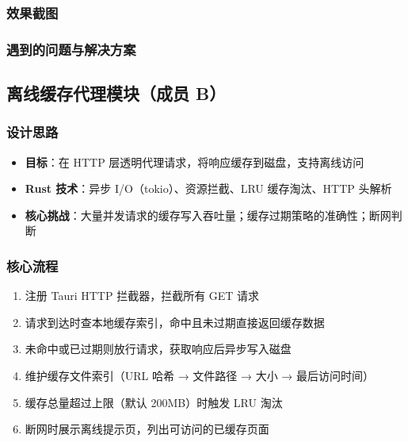 \documentclass[12pt,a4paper]{ctexart}
\begin{document}
\subsubsection{效果截图}


\subsubsection{遇到的问题与解决方案}


\subsection{离线缓存代理模块（成员 B）}

\subsubsection{设计思路}

\begin{itemize}
  \item \textbf{目标}：在 HTTP 层透明代理请求，将响应缓存到磁盘，支持离线访问
  \item \textbf{Rust 技术}：异步 I/O（tokio）、资源拦截、LRU 缓存淘汰、HTTP 头解析
  \item \textbf{核心挑战}：大量并发请求的缓存写入吞吐量；缓存过期策略的准确性；断网判断
\end{itemize}


\subsubsection{核心流程}

\begin{enumerate}[label=(\arabic*)]
  \item 注册 Tauri HTTP 拦截器，拦截所有 GET 请求
  \item 请求到达时查本地缓存索引，命中且未过期直接返回缓存数据
  \item 未命中或已过期则放行请求，获取响应后异步写入磁盘
  \item 维护缓存文件索引（URL 哈希 → 文件路径 → 大小 → 最后访问时间）
  \item 缓存总量超过上限（默认 200MB）时触发 LRU 淘汰
  \item 断网时展示离线提示页，列出可访问的已缓存页面
\end{enumerate}
\end{document}
